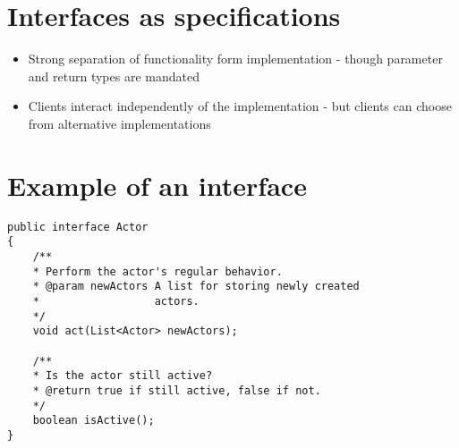\documentclass{article}[18pt]
\begin{document}
\section{Interfaces as specifications}
\begin{itemize}
	\item Strong separation of functionality form implementation - though parameter and return types are mandated
	\item Clients interact independently of the implementation - but clients can choose from alternative implementations
\end{itemize}
\section{Example of an interface}
\begin{verbatim}
public interface Actor
{
	/**
	* Perform the actor's regular behavior.
	* @param newActors A list for storing newly created
	*                  actors.
	*/
	void act(List<Actor> newActors);
	
	/**
	* Is the actor still active?
	* @return true if still active, false if not. 
	*/ 
	boolean isActive(); 
}
\end{verbatim}
\end{document}
